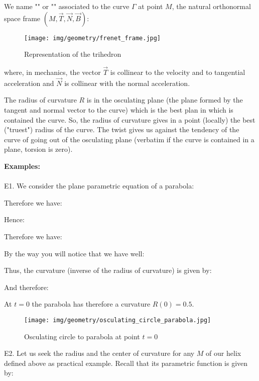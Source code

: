 {	We name "" or "" associated to the curve $\Gamma$ at point $M$, the natural orthonormal space frame $(M,\vec{T},\vec{N},\vec{B})$:
	\begin{figure}[H]
		\centering
		\texttt{[image: img/geometry/frenet\_frame.jpg]}
		\caption{Representation of the trihedron}
	\end{figure}
	where, in mechanics, the vector $\vec{T}$ is collinear to the velocity and to tangential acceleration and $\vec{N}$ is collinear with the normal acceleration.
	\begin{tcolorbox}[title=Remark,colframe=black,arc=10pt]
	The radius of curvature $R$ is in the osculating plane (the plane formed by the tangent and normal vector  to the curve) which is the best plan in which is contained the curve. So, the radius of curvature gives in a point (locally) the best ("truest") radius of the curve. The twist gives us against the tendency of the curve of going out of the osculating plane (verbatim if the curve is contained in a plane, torsion is zero).
	\end{tcolorbox}
	\begin{tcolorbox}[colframe=black,colback=white,sharp corners]
	\textbf{{\Large {}}Examples:}\\\\
	E1. We consider the plane parametric equation of a parabola:
	
	Therefore we have:
	
	Hence:
	
	\end{tcolorbox}
	
	\begin{tcolorbox}[colframe=black,colback=white,sharp corners]
	Therefore we have:
	
	By the way you will notice that we have well:
	
	Thus, the curvature (inverse of the radius of curvature) is given by:
	
	And therefore:
	
	At $t=0$ the parabola has therefore a curvature $R(0)=0.5$.
	\begin{figure}[H]
		\centering
		\texttt{[image: img/geometry/osculating\_circle\_parabola.jpg]}
		\caption[]{Osculating circle to parabola at point $t=0$}
	\end{figure}
	
	E2. Let us seek the radius and the center of curvature for any $M$ of our helix defined above as practical example. Recall that its parametric function is given by:
	

\end{tcolorbox}}
